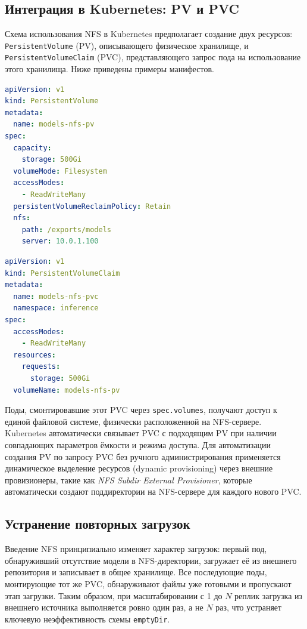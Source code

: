 \subsection*{Интеграция в Kubernetes: PV и PVC}

Схема использования NFS в Kubernetes предполагает создание двух ресурсов: \texttt{PersistentVolume} (PV), описывающего физическое хранилище, и \texttt{PersistentVolumeClaim} (PVC), представляющего запрос пода на использование этого хранилища. Ниже приведены примеры манифестов.

\begin{lstlisting}[language=yaml, caption={PersistentVolume на базе NFS}]
apiVersion: v1
kind: PersistentVolume
metadata:
  name: models-nfs-pv
spec:
  capacity:
    storage: 500Gi
  volumeMode: Filesystem
  accessModes:
    - ReadWriteMany
  persistentVolumeReclaimPolicy: Retain
  nfs:
    path: /exports/models
    server: 10.0.1.100
\end{lstlisting}

\begin{lstlisting}[language=yaml, caption={PersistentVolumeClaim для NFS-тома}]
apiVersion: v1
kind: PersistentVolumeClaim
metadata:
  name: models-nfs-pvc
  namespace: inference
spec:
  accessModes:
    - ReadWriteMany
  resources:
    requests:
      storage: 500Gi
  volumeName: models-nfs-pv
\end{lstlisting}

Поды, смонтировавшие этот PVC через \texttt{spec.volumes}, получают доступ к единой файловой системе, физически расположенной на NFS-сервере. Kubernetes автоматически связывает PVC с подходящим PV при наличии совпадающих параметров ёмкости и режима доступа. Для автоматизации создания PV по запросу PVC без ручного администрирования применяется динамическое выделение ресурсов (dynamic provisioning) через внешние провизионеры, такие как \textit{NFS Subdir External Provisioner}, которые автоматически создают поддиректории на NFS-сервере для каждого нового PVC.

\subsection*{Устранение повторных загрузок}

Введение NFS принципиально изменяет характер загрузок: первый под, обнаруживший отсутствие модели в NFS-директории, загружает её из внешнего репозитория и записывает в общее хранилище. Все последующие поды, монтирующие тот же PVC, обнаруживают файлы уже готовыми и пропускают этап загрузки. Таким образом, при масштабировании с 1 до $N$ реплик загрузка из внешнего источника выполняется ровно один раз, а не $N$ раз, что устраняет ключевую неэффективность схемы \texttt{emptyDir}.

